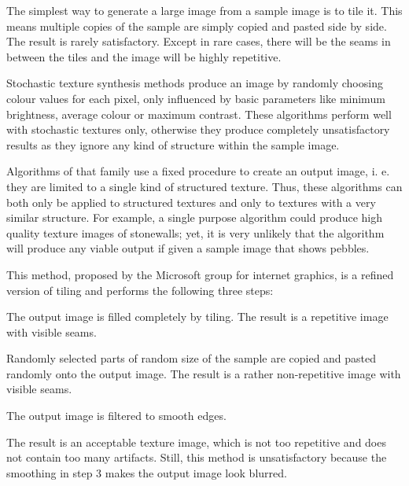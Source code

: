 \begin{compactdesc}
	\item[\lp{Tiling}] The simplest way to generate a large image from a sample image is to tile it. This means multiple copies of the sample are simply copied and pasted side by side. The result is rarely satisfactory. Except in rare cases, there will be the seams in between the tiles and the image will be highly repetitive.
	\item[\lp{Stochastic texture synthesis}] Stochastic texture synthesis methods produce an image by randomly choosing colour values for each pixel, only influenced by basic parameters like minimum brightness, average colour or maximum contrast. These algorithms perform well with stochastic textures only, otherwise they produce completely unsatisfactory results as they ignore any kind of structure within the sample image.
	\item[\lp{Single purpose structured }] 
	\item[\lp{texture synthesis}]
		Algorithms of that family use a fixed procedure to create an output image, i. e. they are limited to a single kind of structured texture. Thus, these algorithms can both only be applied to structured textures and only to textures with a very similar structure. For example, a single purpose algorithm could produce high quality texture images of stonewalls; yet, it is very unlikely that the algorithm will produce any viable output if given a sample image that shows pebbles.
	\item[\lp{Chaos mosaic}] This method, proposed by the Microsoft group for internet graphics, is a refined version of tiling and performs the following three steps:\\
		\begin{enumerate*}[label=\protect\circled{\arabic*},itemjoin=]
			\item The output image is filled completely by tiling. The result is a repetitive image with visible seams.\\
			\item Randomly selected parts of random size of the sample are copied and pasted randomly onto the output image. The result is a rather non-repetitive image with visible seams.\\
			\item The output image is filtered to smooth edges.\\
		\end{enumerate*}
		The result is an acceptable texture image, which is not too repetitive and does not contain too many artifacts. Still, this method is unsatisfactory because the smoothing in step 3 makes the output image look blurred.

\end{compactdesc}
